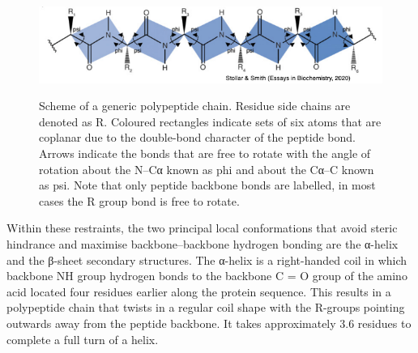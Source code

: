 \documentclass[
  letterpaper,
  DIV=11,
  numbers=noendperiod]{scrreprt}
\begin{document}
\begin{figure}

{\centering 

\href{https://portlandpress.com/essaysbiochem/article/64/4/649/226515/Uncovering-protein-structure}{\includegraphics{./pics/peptide_bond.png}}

}

\caption{Scheme of a generic polypeptide chain. Residue side chains are
denoted as R. Coloured rectangles indicate sets of six atoms that are
coplanar due to the double-bond character of the peptide bond. Arrows
indicate the bonds that are free to rotate with the angle of rotation
about the N--Cα known as phi and about the Cα--C known as psi. Note that
only peptide backbone bonds are labelled, in most cases the R group bond
is free to rotate.}

\end{figure}

Within these restraints, the two principal local conformations that
avoid steric hindrance and maximise backbone--backbone hydrogen bonding
are the α-helix and the β-sheet secondary structures. The α-helix is a
right-handed coil in which backbone NH group hydrogen bonds to the
backbone C = O group of the amino acid located four residues earlier
along the protein sequence. This results in a polypeptide chain that
twists in a regular coil shape with the R-groups pointing outwards away
from the peptide backbone. It takes approximately 3.6 residues to
complete a full turn of a helix.
\end{document}
